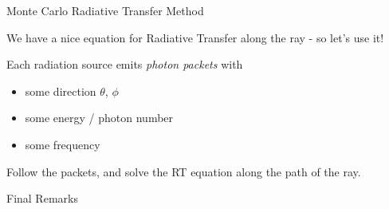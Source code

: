 \begin{frame}{Monte Carlo Radiative Transfer Method}

We have a nice equation for Radiative Transfer along the ray - so let's use it!

Each radiation source emits \emph{photon packets} with

\begin{itemize}
	\item some direction $\theta$, $\phi$
	\item some energy / photon number
	\item some frequency
\end{itemize}

Follow the packets, and solve the RT equation along the path of the ray.


\end{frame}





\begin{frame}{Final Remarks}


\end{frame}






